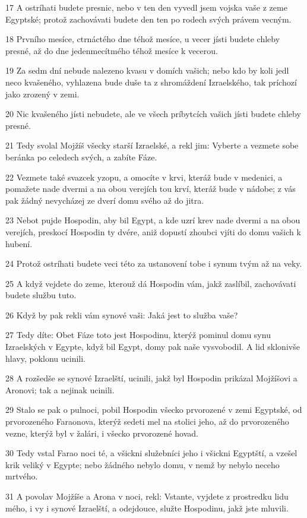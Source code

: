 \par 17 A ostríhati budete presnic, nebo v ten den vyvedl jsem vojska vaše z zeme Egyptské; protož zachovávati budete den ten po rodech svých právem vecným.
\par 18 Prvního mesíce, ctrnáctého dne téhož mesíce, u vecer jísti budete chleby presné, až do dne jedenmecítmého téhož mesíce k vecerou.
\par 19 Za sedm dní nebude nalezeno kvasu v domích vašich; nebo kdo by koli jedl neco kvašeného, vyhlazena bude duše ta z shromáždení Izraelského, tak príchozí jako zrozený v zemi.
\par 20 Nic kvašeného jísti nebudete, ale ve všech príbytcích vašich jísti budete chleby presné.
\par 21 Tedy svolal Mojžíš všecky starší Izraelské, a rekl jim: Vyberte a vezmete sobe beránka po celedech svých, a zabíte Fáze.
\par 22 Vezmete také svazcek yzopu, a omocíte v krvi, kteráž bude v medenici, a pomažete nade dvermi a na obou verejích tou krví, kteráž bude v nádobe; z vás pak žádný nevycházej ze dverí domu svého až do jitra.
\par 23 Nebot pujde Hospodin, aby bil Egypt, a kde uzrí krev nade dvermi a na obou verejích, preskocí Hospodin ty dvére, aniž dopustí zhoubci vjíti do domu vašich k hubení.
\par 24 Protož ostríhati budete veci této za ustanovení tobe i synum tvým až na veky.
\par 25 A když vejdete do zeme, kterouž dá Hospodin vám, jakž zaslíbil, zachovávati budete službu tuto.
\par 26 Když by pak rekli vám synové vaši: Jaká jest to služba vaše?
\par 27 Tedy díte: Obet Fáze toto jest Hospodinu, kterýž pominul domu synu Izraelských v Egypte, když bil Egypt, domy pak naše vysvobodil. A lid sklonivše hlavy, poklonu ucinili.
\par 28 A rozšedše se synové Izraelští, ucinili, jakž byl Hospodin prikázal Mojžíšovi a Aronovi; tak a nejinak ucinili.
\par 29 Stalo se pak o pulnoci, pobil Hospodin všecko prvorozené v zemi Egyptské, od prvorozeného Faraonova, kterýž sedeti mel na stolici jeho, až do prvorozeného vezne, kterýž byl v žalári, i všecko prvorozené hovad.
\par 30 Tedy vstal Farao noci té, a všickni služebníci jeho i všickni Egyptští, a vzešel krik veliký v Egypte; nebo žádného nebylo domu, v nemž by nebylo neceho mrtvého.
\par 31 A povolav Mojžíše a Arona v noci, rekl: Vstante, vyjdete z prostredku lidu mého, i vy i synové Izraelští, a odejdouce, služte Hospodinu, jakž jste mluvili.
